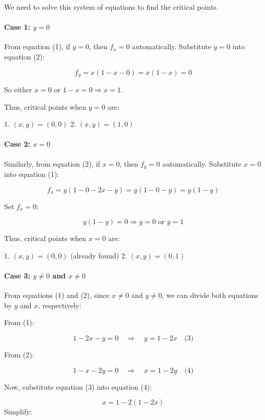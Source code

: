 \documentclass[11pt]{article}
\begin{document}
We need to solve this system of equations to find the critical points.

\paragraph{Case 1: \( y = 0 \)}

From equation (1), if \( y = 0 \), then \( f_x = 0 \) automatically. Substitute \( y = 0 \) into equation (2):

\[
f_y = x(1 - x - 0) = x(1 - x) = 0
\]

So either \( x = 0 \) or \( 1 - x = 0 \Rightarrow x = 1 \).

Thus, critical points when \( y = 0 \) are:

1. \( (x, y) = (0, 0) \)
2. \( (x, y) = (1, 0) \)

\paragraph{Case 2: \( x = 0 \)}

Similarly, from equation (2), if \( x = 0 \), then \( f_y = 0 \) automatically. Substitute \( x = 0 \) into equation (1):

\[
f_x = y(1 - 0 - 2x - y) = y(1 - 0 - y) = y(1 - y)
\]

Set \( f_x = 0 \):

\[
y(1 - y) = 0 \Rightarrow y = 0 \text{ or } y = 1
\]

Thus, critical points when \( x = 0 \) are:

1. \( (x, y) = (0, 0) \) (already found)
2. \( (x, y) = (0, 1) \)

\paragraph{Case 3: \( y \neq 0 \) and \( x \neq 0 \)}

From equations (1) and (2), since \( x \neq 0 \) and \( y \neq 0 \), we can divide both equations by \( y \) and \( x \), respectively:

From (1):

\[
1 - 2x - y = 0 \quad \Rightarrow \quad y = 1 - 2x \quad \text{(3)}
\]

From (2):

\[
1 - x - 2y = 0 \quad \Rightarrow \quad x = 1 - 2y \quad \text{(4)}
\]

Now, substitute equation (3) into equation (4):

\[
x = 1 - 2(1 - 2x)
\]
Simplify:
\end{document}
